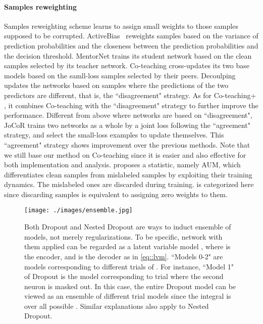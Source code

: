 \documentclass[journal]{IEEEtran}
\begin{document}
\paragraph{Samples reweighting}
Samples reweighting scheme learns to assign small weights to those samples supposed to be corrupted.
ActiveBias~\cite{chang2017active} reweights samples based on the variance of prediction probabilities and the closeness between the prediction probabilities and the decision threshold.
MentorNet \cite{jiang2018mentornet} trains its student network based on the clean samples selected by its teacher network.
Co-teaching \cite{han2018co} cross-updates its two base models 
based on the samll-loss samples selected by their peers.
Decoulping \cite{malach2017decoupling} updates the networks based on samples where the predictions of the two predictors are different, that is, the ``disagreement" strategy.
As for Co-teaching+ \cite{yu2019does}, it combines Co-teaching with the ``disagreement" strategy to further improve the performance.
Different from above where networks are based on ``disagreement", JoCoR \cite{wei2020combating} trains two networks as a whole by a joint loss following the ``agreement" strategy, and select the small-loss examples to update themselves.
This ``agreement" strategy shows improvement over the previous methods.
Note that we still base our method on Co-teaching since it is easier and also effective for both implementation and analysis.
\cite{pleiss2020identifying} proposes a statistic, namely AUM, which differentiates clean samples from mislabeled samples by exploiting their training dynamics.
The mislabeled ones are discarded during training. 
\cite{pleiss2020identifying} is categorized here since discarding samples is equivalent to assigning zero weights to them.

\begin{figure}[t]
	\begin{minipage}[t]{0.45\textwidth}  
		\centering  
		\texttt{[image: ./images/ensemble.jpg]}
	\end{minipage}  
	\centering  
	\caption{Both Dropout and Nested Dropout are ways to induct ensemble of models, not merely regularizations. 
	To be specific, network with them applied can be regarded as a latent variable model , where  is the encoder, and  is the decoder as in \eqref{eq::lvm}.
	``Models 0-2" are models corresponding to different trials of .
	For instance, ``Model 1" of Dropout is the model corresponding to trial  where the second neuron is masked out. 
	In this case, the entire Dropout model can be viewed as an ensemble of different trial models since the integral is over all possible . 
	Similar explanations also apply to Nested Dropout.}
	\label{fig::compress}
	\vspace{-5mm}
\end{figure}
\end{document}

